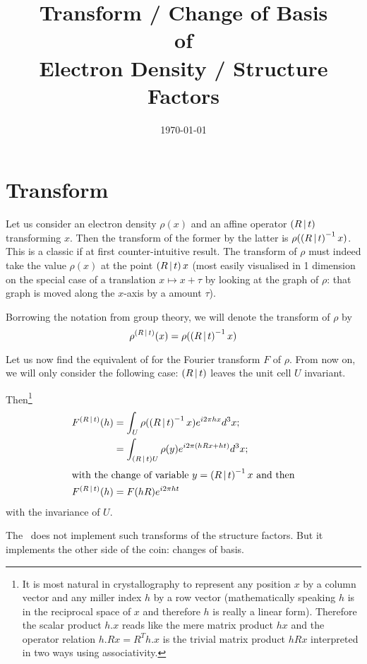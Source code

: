\documentclass[11pt]{article}
\title{Transform / Change of Basis\\of\\Electron Density / Structure Factors}
\author{\lucjbourhis}
\date{\today}
\begin{document}
\maketitle

\section{Transform}

Let us consider an electron density $\rho(x)$ and an affine operator $\left( R\,\vert\, t \right)$ transforming $x$. Then the transform of the former by the latter is $\rho(\left( R\,\vert\, t \right)^{-1}x)$. This is a classic if at first counter-intuitive result. The transform of $\rho$ must indeed take the value $\rho(x)$ at the point $\left( R\,\vert\, t \right)x$ (most easily visualised in 1 dimension on the special case of a translation $x \mapsto x+\tau$ by looking at the graph of $\rho$: that graph is moved along the $x$-axis by a amount $\tau$).

Borrowing the notation from group theory, we will denote the transform of $\rho$ by
\begin{equation}
\rho^{\left( R\,\vert\, t \right)}(x) = \rho(\left( R\,\vert\, t \right)^{-1}x)
\label{eqn:rho:transform}
\end{equation}

Let us now find the equivalent of  for the Fourier transform $F$ of $\rho$. From now on, we will only consider the following case: $\left( R\,\vert\, t \right)$ leaves the unit cell $U$ invariant.

Then\footnote{It is most natural in crystallography to represent any position $x$ by a column vector and any miller index $h$ by a row vector (mathematically speaking $h$ is in the reciprocal space of $x$ and therefore $h$ is really a linear form). Therefore the scalar product $h.x$ reads like the mere matrix product $hx$ and the operator relation $h.Rx = R^Th.x$ is the trivial matrix product $hRx$ interpreted in two ways using associativity.}
\begin{align}
F^{\left( R\,\vert\, t \right)}(h) &= \int_U \rho(\left( R\,\vert\, t \right)^{-1}x) e^{i2\pi hx} d^3x ; \nonumber \\
&= \int_{\left( R\,\vert\, t \right)U} \rho(y) e^{i2\pi (hRx + ht)} d^3x ;\nonumber\\
\intertext{with the change of variable $y = \left( R\,\vert\, t \right)^{-1}x$ and then}
F^{\left( R\,\vert\, t \right)}(h) &= F(hR) e^{i2\pi ht}
\end{align}
with the invariance of $U$.

The \cctbx\ does not implement such transforms of the structure factors. But it implements the other side of the coin: changes of basis.
\end{document}
